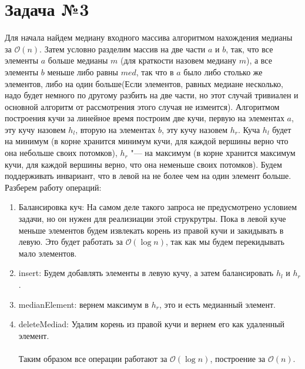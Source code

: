 \documentclass{article}
\begin{document}
\section*{Задача №3} 
Для начала найдем медиану входного массива алгоритмом нахождения медианы за $\mathcal{O}(n)$. Затем условно разделим массив на две части $a$ и $b$, так, что все элементы $a$ больше медианы $m$ (для краткости назовем медиану $m$), а все элементы $b$ меньше либо равны $med$, так что в $a$ было либо столько же элементов, либо на один больше(Если элементов, равных медиане несколько, надо будет немного по другому разбить на две части, но этот случай тривиален и основной алгоритм от рассмотрения этого случая не измеится). Алгоритмом построения кучи за линейное время построим две кучи, первую на элементах $a$, эту кучу назовем $h_l$, вторую на элементах $b$, эту кучу назовем $h_r$. Куча $h_l$ будет на минимум (в корне хранится минимум кучи, для каждой вершины верно что она небольше своих потомков), $h_r$ "--- на максимум (в корне хранится максимум кучи, для каждой вершины верно, что она неменьше своих потомков). Будем поддерживать инвариант, что в левой 
на не более чем на один элемент больше.
\\
Разберем работу операций:
\begin{enumerate}
\item{Балансировка куч}: На самом деле такого запроса не предусмотрено условием задачи, но он нужен для реализиации этой струкрутры. Пока в левой куче меньше элементов будем извлекать корень из правой кучи и закидывать в левую. Это будет работать за $\mathcal{O}(\log{n})$, так как мы будем перекидывать мало элементов.
\item{insert}: Будем добавлять элементы в левую кучу, а затем балансировать $h_l$ и $h_r$.
\item{medianElement}: вернем максимум в $h_r$, это и есть медианный элемент.
\item{deleteMediad}: Удалим корень из правой кучи и вернем его как удаленный элемент.
\\\\
Таким образом все операции работают за $\mathcal{O}(\log{n})$, построение за $\mathcal{O}(n)$.
\end{enumerate}
\end{document}
